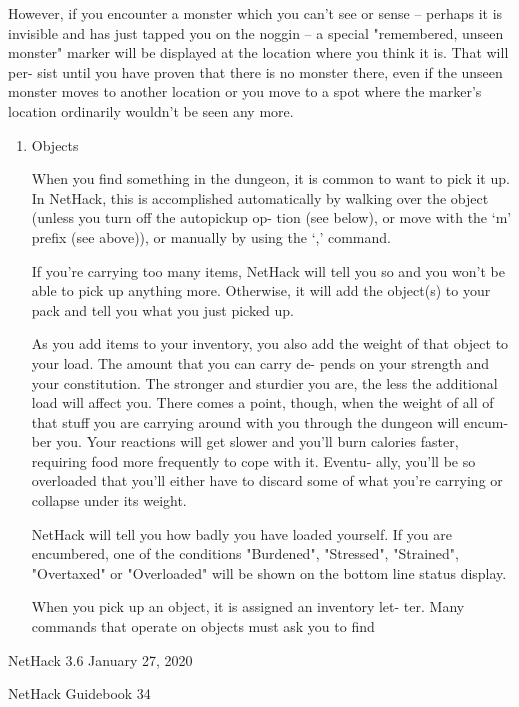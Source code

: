 \documentclass[11pt]{article}
\begin{document}
   However, if you encounter a monster which you can't see or
sense -- perhaps it is invisible and has just tapped you on the
noggin -- a special "remembered, unseen monster" marker will be
displayed at the location where you think it is. That will per-
sist until you have proven that there is no monster there, even
if the unseen monster moves to another location or you move to a
spot where the marker's location ordinarily wouldn't be seen any
more.
\begin{enumerate}
\item Objects

   When you find something in the dungeon, it is common to want
to pick it up. In NetHack, this is accomplished automatically by
walking over the object (unless you turn off the autopickup op-
tion (see below), or move with the `m' prefix (see above)), or
manually by using the `,' command.

   If you're carrying too many items, NetHack will tell you so
and you won't be able to pick up anything more.  Otherwise, it
will add the object(s) to your pack and tell you what you just
picked up.

   As you add items to your inventory, you also add the weight
of that object to your load. The amount that you can carry de-
pends on your strength and your constitution. The stronger and
sturdier you are, the less the additional load will affect you.
There comes a point, though, when the weight of all of that stuff
you are carrying around with you through the dungeon will encum-
ber you. Your reactions will get slower and you'll burn calories
faster, requiring food more frequently to cope with it. Eventu-
ally, you'll be so overloaded that you'll either have to discard
some of what you're carrying or collapse under its weight.

   NetHack will tell you how badly you have loaded yourself.
If you are encumbered, one of the conditions  "Burdened",
"Stressed", "Strained", "Overtaxed" or "Overloaded" will be shown
on the bottom line status display.

   When you pick up an object, it is assigned an inventory let-
ter.  Many commands that operate on objects must ask you to find
\end{enumerate}


NetHack 3.6                   January 27, 2020





NetHack Guidebook                       34
\end{document}
